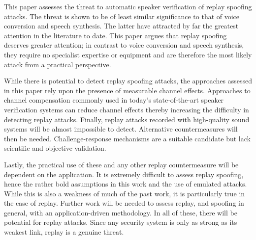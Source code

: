 
This paper assesses the threat to automatic speaker verification of replay spoofing attacks.  The threat is shown to be of least similar significance to that of voice conversion and speech synthesis.  The latter have attracted by far the greatest attention in the literature to date.  This paper argues that replay spoofing deserves greater attention; in contrast to voice conversion and speech synthesis, they require no specialist expertise or equipment and are therefore the most likely attack from a practical perspective.  

While there is potential to detect replay spoofing attacks, the approaches assessed in this paper rely upon the presence of measurable channel effects.  Approaches to channel compensation commonly used in today's state-of-the-art speaker verification systems can reduce channel effects thereby increasing the difficulty in detecting replay attacks.  Finally, replay attacks recorded with high-quality sound systems will be almost impossible to detect.  Alternative countermeasures will then be needed.  Challenge-response mechanisms are a suitable candidate but lack scientific and objective validation.

Lastly, the practical use of these and any other replay countermeasure will be dependent on the application.  It is extremely difficult to assess replay spoofing, hence the rather bold assumptions in this work and the use of emulated attacks.  While this is also a weakness of much of the past work, it is particularly true in the case of replay.  Further work will be needed to assess replay, and spoofing in general, with an application-driven methodology.  In all of these, there will be potential for replay attacks.  Since any security system is only as strong as its weakest link, replay is a genuine threat.
